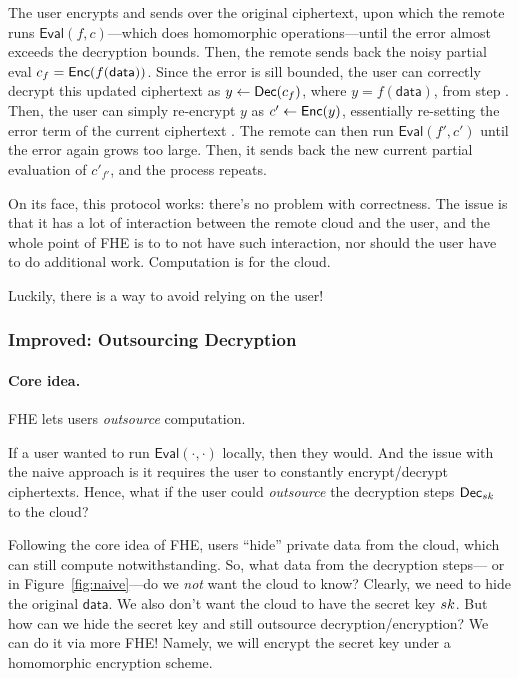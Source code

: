 \documentclass[11pt]{article}
\newcommand*\circled[1]{\tikz[baseline=(char.base)]{
            \node[shape=circle,draw,inner sep=2pt] (char) {#1};}}
\newcommand{\data}{\mathsf{data}}
\begin{document}
The user encrypts and sends over the original ciphertext, upon which the remote runs $\mathsf{Eval}(f, c)$---which does homomorphic operations---until the error almost exceeds the decryption bounds. Then, the remote sends back the noisy partial eval $c_f = \skcenc(f(\data))$. Since the error is sill bounded, the user can correctly decrypt this updated ciphertext as $y \gets \mathsf{Dec}(c_f)$, where $y=f(\data)$, from step \circled{1}. Then, the user can simply re-encrypt $y$ as $c' \gets \mathsf{Enc}(y)$, essentially re-setting the error term of the current ciphertext \circled{2}. The remote can then run $\mathsf{Eval}(f', c')$ until the error again grows too large. Then, it sends back the new current partial evaluation of $c'_{f'}$, and the process repeats.

On its face, this protocol works: there's no problem with correctness. The issue is that it has a lot of interaction between the remote cloud and the user, and the whole point of FHE is to to not have such interaction, nor should the user have to do additional work. Computation is for the cloud.

\bigskip

\noindent Luckily, there is a way to avoid relying on the user!


\subsubsection{Improved: Outsourcing Decryption}

\paragraph{Core idea.} FHE lets users \emph{outsource} computation.

\medskip

If a user wanted to run $\mathsf{Eval}(\cdot,\cdot)$ locally, then they would. And the issue with the naive approach is it requires the user to constantly encrypt/decrypt ciphertexts. Hence, what if the user could \emph{outsource} the decryption steps $\mathsf{Dec}_{sk}$ to the cloud?

Following the core idea of FHE, users ``hide'' private data from the cloud, which can still compute notwithstanding. So, what data from the decryption steps---\circled{1} or \circled{2} in Figure~\ref{fig:naive}---do we \emph{not} want the cloud to know? Clearly, we need to hide the original $\data$. We also don't want the cloud to have the secret key $sk$. But how can we hide the secret key and still outsource decryption/encryption? We can do it via more FHE! Namely, we will encrypt the secret key under a homomorphic encryption scheme.
\end{document}
